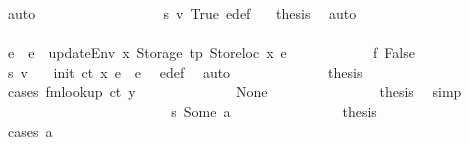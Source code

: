 \begin{isabellebody}
\ auto\isanewline
\ \ \ \ \ \ \ \ \ \ \ \ \ \ \ \ \isamarkupfalse%
\ s{}\ v{}\ True\ e{\isacharprime}{\kern0pt}{\isacharunderscore}{\kern0pt}def\ {\isacharasterisk}{\kern0pt}\ \isamarkupfalse%
\ {\isacharquery}{\kern0pt}thesis\ \isamarkupfalse%
\ auto\isanewline
\ \ \ \ \ \ \ \ \ \ \ \ \ \ \isamarkupfalse%
\isanewline
\ \ \ \ \ \ \ \ \ \ \ \ \isamarkupfalse%
\isanewline
\ \ \ \ \ \ \ \ \ \ \isamarkupfalse%
\isanewline
\ \ \ \ \ \ \ \ \isamarkupfalse%
\isanewline
\ \ \ \ \ \ \ \ \ \ \isamarkupfalse%
\ e{\isacharprime}{\kern0pt}\ \ {\isachardoublequoteopen}e{\isacharprime}{\kern0pt}\ {\isacharequal}{\kern0pt}\ updateEnv\ x\ {\isacharparenleft}{\kern0pt}Storage\ tp{\isacharparenright}{\kern0pt}\ {\isacharparenleft}{\kern0pt}Storeloc\ x{\isacharparenright}{\kern0pt}\ e{\isachardoublequoteclose}\isanewline
\ \ \ \ \ \ \ \ \ \ \isamarkupfalse%
\ f{}{\isacharcolon}{\kern0pt}\ False\isanewline
\ \ \ \ \ \ \ \ \ \ \isamarkupfalse%
\ s{}\ v{}\ \isamarkupfalse%
\ {\isacharasterisk}{\kern0pt}{\isacharcolon}{\kern0pt}\ {\isachardoublequoteopen}init\ ct\ x\ e\ {\isacharequal}{\kern0pt}\ e{\isacharprime}{\kern0pt}{\isachardoublequoteclose}\ \isamarkupfalse%
\ e{\isacharprime}{\kern0pt}{\isacharunderscore}{\kern0pt}def\ \isamarkupfalse%
\ auto\isanewline
\ \ \ \ \ \ \ \ \ \ \isamarkupfalse%
\ \isamarkupfalse%
\ {\isacharquery}{\kern0pt}thesis\isanewline
\ \ \ \ \ \ \ \ \ \ \isamarkupfalse%
\ {\isacharparenleft}{\kern0pt}cases\ {\isachardoublequoteopen}fmlookup\ ct\ y{\isachardoublequoteclose}{\isacharparenright}{\kern0pt}\isanewline
\ \ \ \ \ \ \ \ \ \ \ \ \isamarkupfalse%
\ None\isanewline
\ \ \ \ \ \ \ \ \ \ \ \ \isamarkupfalse%
\ \isamarkupfalse%
\ {\isacharquery}{\kern0pt}thesis\ \isamarkupfalse%
\ simp\isanewline
\ \ \ \ \ \ \ \ \ \ \isamarkupfalse%
\isanewline
\ \ \ \ \ \ \ \ \ \ \ \ \isamarkupfalse%
\ s{}{\isacharcolon}{\kern0pt}\ {\isacharparenleft}{\kern0pt}Some\ a{\isacharparenright}{\kern0pt}\isanewline
\ \ \ \ \ \ \ \ \ \ \ \ \isamarkupfalse%
\ \isamarkupfalse%
\ {\isacharquery}{\kern0pt}thesis\isanewline
\ \ \ \ \ \ \ \ \ \ \ \ \isamarkupfalse%
\ {\isacharparenleft}{\kern0pt}cases\ a{\isacharparenright}{\kern0pt}\isanewline

\end{isabellebody}
